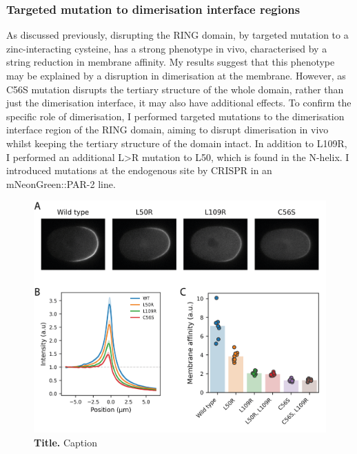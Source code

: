 \documentclass[12pt]{"article"}
\newcommand{\mycaption}[2]{\caption[#1]{\textbf{#1.} #2}}
\begin{document}

\clearpage
\subsubsection{Targeted mutation to dimerisation interface regions}

As discussed previously, disrupting the RING domain, by targeted mutation to a zinc-interacting cysteine, has a strong phenotype in vivo, characterised by a string reduction in membrane affinity. My results suggest that this phenotype may be explained by a disruption in dimerisation at the membrane. However, as C56S mutation disrupts the tertiary structure of the whole domain, rather than just the dimerisation interface, it may also have additional effects. To confirm the specific role of dimerisation, I performed targeted mutations to the dimerisation interface region of the RING domain, aiming to disrupt dimerisation in vivo whilst keeping the tertiary structure of the domain intact. In addition to L109R, I performed an additional L>R mutation to L50, which is found in the N-helix. I introduced mutations at the endogenous site by CRISPR in an mNeonGreen::PAR-2 line. \\


\begin{figure}[!h]
\includegraphics[scale=0.9]{dimer_interface_mutants_in_vivo}
\setlength{\abovecaptionskip}{20pt}
\centering
\mycaption{Title}{Caption}
\end{figure}
\end{document}
